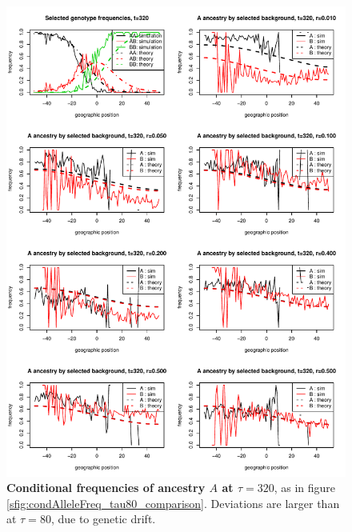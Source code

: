 \begin{figure}
    \includegraphics{figs/cond_freqs_comparison_tau_320.pdf}
    \caption{
        \textbf{Conditional frequencies of ancestry $A$ at $\tau=320$},
        as in figure \ref{sfig:condAlleleFreq_tau80_comparison}.
        Deviations are larger than at $\tau=80$, 
        due to genetic drift.
    } \label{sfig:condAlleleFreq_tau320_comparison}
\end{figure}


